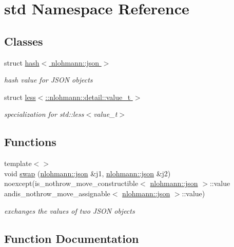 \hypertarget{namespacestd}{}\section{std Namespace Reference}
\label{namespacestd}
\subsection*{Classes}
\begin{DoxyCompactItemize}
\item 
struct \hyperlink{structstd_1_1hash_3_01nlohmann_1_1json_01_4}{hash$<$ nlohmann\+::json $>$}
\begin{DoxyCompactList}\small\item\em hash value for J\+S\+ON objects \end{DoxyCompactList}\item 
struct \hyperlink{structstd_1_1less_3_1_1nlohmann_1_1detail_1_1value__t_01_4}{less$<$\+::nlohmann\+::detail\+::value\+\_\+t $>$}
\begin{DoxyCompactList}\small\item\em specialization for std\+::less$<$value\+\_\+t$>$ \end{DoxyCompactList}\end{DoxyCompactItemize}
\subsection*{Functions}
\begin{DoxyCompactItemize}
\item 
{\footnotesize template$<$$>$ }\\void \hyperlink{namespacestd_a248fd91b080106301215d145dd58cd9d}{swap} (\hyperlink{namespacenlohmann_a2bfd99e845a2e5cd90aeaf1b1431f474}{nlohmann\+::json} \&j1, \hyperlink{namespacenlohmann_a2bfd99e845a2e5cd90aeaf1b1431f474}{nlohmann\+::json} \&j2) noexcept(is\+\_\+nothrow\+\_\+move\+\_\+constructible$<$ \hyperlink{namespacenlohmann_a2bfd99e845a2e5cd90aeaf1b1431f474}{nlohmann\+::json} $>$\+::value andis\+\_\+nothrow\+\_\+move\+\_\+assignable$<$ \hyperlink{namespacenlohmann_a2bfd99e845a2e5cd90aeaf1b1431f474}{nlohmann\+::json} $>$\+::value)
\begin{DoxyCompactList}\small\item\em exchanges the values of two J\+S\+ON objects \end{DoxyCompactList}\end{DoxyCompactItemize}


\subsection{Function Documentation}
